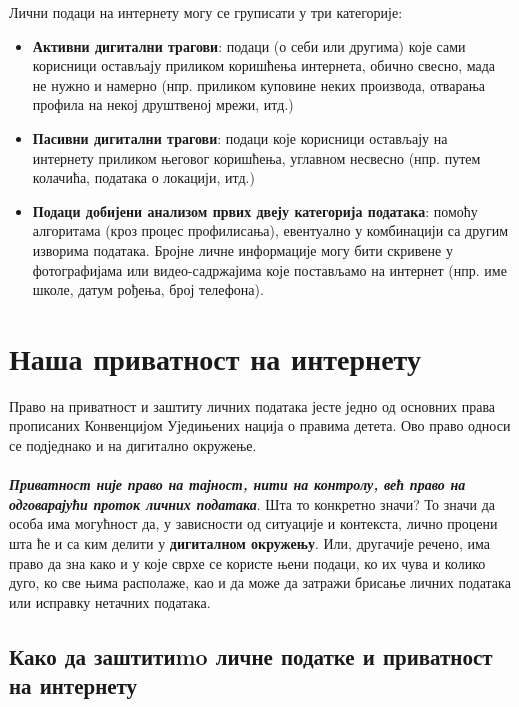 \documentclass[a4paper]{article}
\begin{document}
Лични подаци на интернету могу се груписати у три категорије:


\begin{itemize}


\item     \textbf{Активни дигитални трагови}: подаци (о себи или другима) које сами корисници остављају приликом коришћења интернета, обично свесно, мада не нужно и намерно  (нпр. приликом куповине неких производа, отварања профила на некој друштвеној мрежи, итд.)
    
\item     \textbf{Пасивни дигитални трагови}: подаци које корисници остављају на интернету приликом његовог коришћења, углавном несвесно (нпр. путем колачића, података о локацији, итд.)
    
\item     \textbf{Подаци добијени анализом првих двеју категорија података}: помоћу алгоритама  (кроз процес профилисања), евентуално у комбинацији са другим изворима података.
Бројне личне информације могу бити скривене у фотографијама или видео-садржајима које постављамо на интернет (нпр. име школе, датум рођења, број телефона).

\end{itemize}
\section{Наша приватност на интернету}

Право на приватност и заштиту личних података јесте једно од основних права прописаних Конвенцијом Уједињених нација о правима детета. Ово право односи се подједнако и на дигитално окружење.
\paragraph{} \textbf{\textit{Приватност није право на тајност, нити на контролу, већ право на одговарајући проток личних података}}\cite{quote}. Шта то конкретно значи? То значи да особа има могућност да, у зависности од ситуације и контекста, лично процени шта ће и са ким делити у \textbf{дигиталном окружењу}. Или, другачије речено, има право да зна како и у које сврхе се користе њени подаци, ко их чува и колико дуго, ко све њима располаже, као и да може да затражи брисање личних података или исправку нетачних података.

    
\subsection{Како да заштитиmo личне податке и приватност на интернету}
\end{document}
